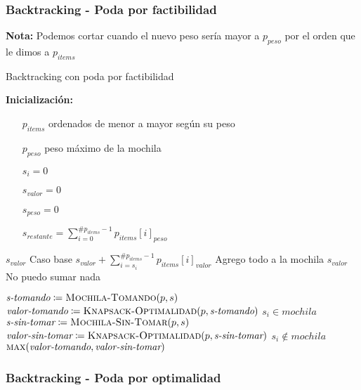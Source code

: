 \documentclass[fleqn, 11pt]{article}
\def\is{\coloneqq}
\begin{document}
\subsubsection{Backtracking - Poda por factibilidad}
\textbf{Nota:} Podemos cortar cuando el nuevo peso sería mayor a $p_{peso}$ por
el orden que le dimos a $p_{items}$

\begin{algorithm}
\caption{Backtracking con poda por factibilidad}
\begin{algorithmic}[1]
\item[\textbf{Inicialización:}]
\item[] \begin{itemize}
	\item[] $p_{items}$ ordenados de menor a mayor según su peso
	\item[] $p_{peso}$ peso máximo de la mochila
	\item[] $s_i = 0$
	\item[] $s_{valor} = 0$
	\item[] $s_{peso} = 0$
	\item[] $s_{restante} = \sum_{i = 0}^{\#p_{items} - 1} p_{items}[i]_{peso}$
\end{itemize}
\Statex
{}
	\State \Return $s_{valor}$
	\Comment Caso base
\EndIf
{}
	\State \Return $s_{valor} + \sum_{i=s_i}^{\#p_{items} - 1} p_{items}[i]_{valor}$
	\Comment Agrego todo a la mochila
\EndIf
{}
	\State \Return $s_{valor}$
	\Comment No puedo sumar nada
\EndIf

\State $\textit{s-tomando} \is \Call{Mochila-Tomando}{p, s}$
\State $\textit{valor-tomando} \is \Call{Knapsack-Optimalidad}{p, \textit{s-tomando}}$
\Comment $s_i \in mochila$
\State $\textit{s-sin-tomar} \is \Call{Mochila-Sin-Tomar}{p, s}$
\State $\textit{valor-sin-tomar} \is \Call{Knapsack-Optimalidad}{p, \textit{s-sin-tomar}}$
\Comment $s_i \not\in mochila$
\State \Return $\Call{max}{\textit{valor-tomando}, \textit{valor-sin-tomar}}$
\EndFunction
\end{algorithmic}
\end{algorithm}
\newpage

\subsubsection{Backtracking - Poda por optimalidad}
\end{document}
